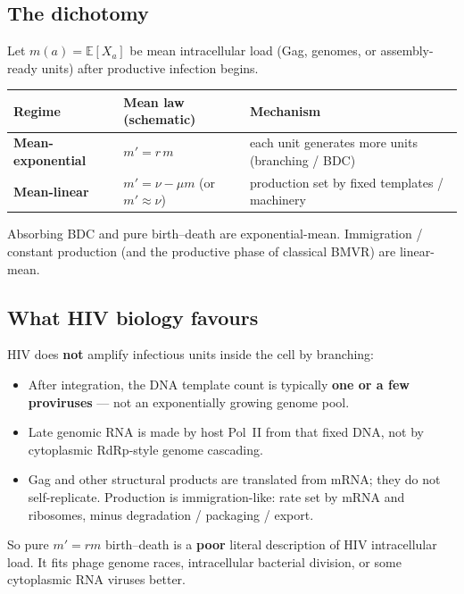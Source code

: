 \documentclass[11pt,a4paper]{article}
\newcommand{\E}{\mathbb{E}}
\theoremstyle{plain}
\theoremstyle{definition}
\theoremstyle{remark}
\begin{document}
\subsection{The dichotomy}

Let $m(a)=\E[X_a]$ be mean intracellular load (Gag, genomes, or
assembly-ready units) after productive infection begins.

\begin{center}
\renewcommand{\arraystretch}{1.25}
\begin{tabular}{@{}lll@{}}
\toprule
Regime & Mean law (schematic) & Mechanism \\
\midrule
\textbf{Mean-exponential} & $m'=r\,m$ & each unit generates more units (branching / BDC) \\
\textbf{Mean-linear} & $m'=\nu-\mu m$ (or $m'\approx\nu$) & production set by fixed templates / machinery \\
\bottomrule
\end{tabular}
\end{center}

Absorbing BDC and pure birth--death are exponential-mean. Immigration /
constant production (and the productive phase of classical BMVR) are
linear-mean.

\subsection{What HIV biology favours}

HIV does \textbf{not} amplify infectious units inside the cell by branching:

\begin{itemize}
\item After integration, the DNA template count is typically \textbf{one or a few
proviruses} --- not an exponentially growing genome pool.
\item Late genomic RNA is made by host Pol~II from that fixed DNA, not by
cytoplasmic RdRp-style genome cascading.
\item Gag and other structural products are translated from mRNA; they do not
self-replicate. Production is immigration-like: rate set by mRNA and ribosomes,
minus degradation / packaging / export.
\end{itemize}

So pure $m'=rm$ birth--death is a \textbf{poor} literal description of HIV
intracellular load. It fits phage genome races, intracellular bacterial
division, or some cytoplasmic RNA viruses better.
\end{document}
